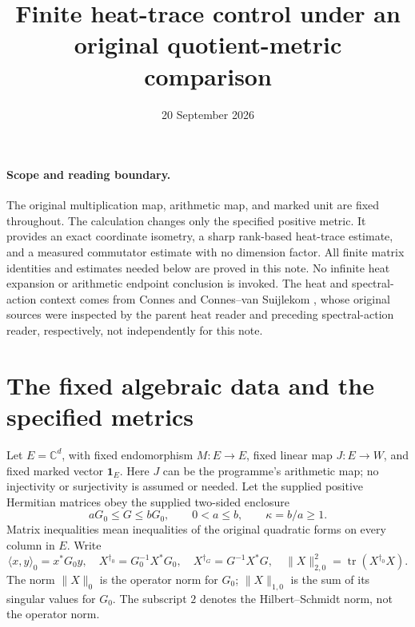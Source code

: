 \documentclass[11pt]{article}
\title{Finite heat-trace control under an original quotient-metric comparison}
\author{}
\date{20 September 2026}
\newcommand{\tr}{\operatorname{tr}}
\newcommand{\adjzero}{\dagger_0}
\newcommand{\adjg}{\dagger_G}
\begin{document}
\maketitle

\paragraph{Scope and reading boundary.}
The original multiplication map, arithmetic map, and marked unit are fixed
throughout. The calculation changes only the specified positive metric.
It provides an exact coordinate isometry, a sharp rank-based heat-trace
estimate, and a measured commutator estimate with no dimension factor.
All finite matrix identities and estimates needed below are proved in this
note. No infinite heat expansion or arithmetic endpoint conclusion is
invoked. The heat and spectral-action context comes from Connes
\cite{ConnesHeat} and Connes--van Suijlekom \cite{ConnesSuijlekom}, whose
original sources were inspected by the parent heat reader and preceding
spectral-action reader, respectively, not independently for this note.

\section{The fixed algebraic data and the specified metrics}

Let \(E=\mathbb C^d\), with fixed endomorphism \(M:E\to E\), fixed linear
map \(J:E\to W\), and fixed marked vector \(\mathbf1_E\).
Here \(J\) can be the programme's arithmetic map; no injectivity or
surjectivity is assumed or needed. Let the supplied positive Hermitian
matrices obey the supplied two-sided enclosure
\begin{equation}
 aG_0\le G\le bG_0,\qquad 0<a\le b,\qquad \kappa=b/a\ge1.
 \tag{EM1}\label{EM1}
\end{equation}
Matrix inequalities mean inequalities of the original quadratic forms
on every column in \(E\). Write
\begin{equation}
 \langle x,y\rangle_0=x^*G_0y,\quad
 X^{\adjzero}=G_0^{-1}X^*G_0,\quad
 X^{\adjg}=G^{-1}X^*G,\quad
 \|X\|_{2,0}^2=\tr(X^{\adjzero}X).
 \tag{EM2}\label{EM2}
\end{equation}
The norm \(\|X\|_0\) is the operator norm for \(G_0\);
\(\|X\|_{1,0}\) is the sum of its singular values for \(G_0\).
The subscript \(2\) denotes the Hilbert--Schmidt norm, not the operator norm.
\end{document}
